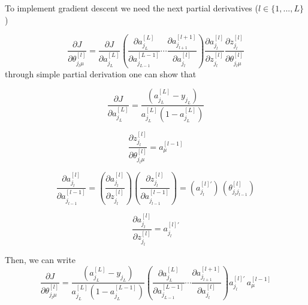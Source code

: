 \documentclass[a4paper,11pt]{article}
\newcommand{\na}[2]{a_{#1}^{[#2]}}
\newcommand{\nz}[2]{z_{#1}^{[#2]}}
\newcommand{\nt}[3]{\theta_{#1 #2}^{[#3]}}
\begin{document}
To implement gradient descent we need 
the next partial derivatives ($l\in\{1,...,L\} $)

\begin{equation}
    \frac{\partial J }{\partial  \nt{j_l}{\mu}{l}  } 
   =\frac{\partial J  }{\partial \na{j_L}{L}  }
    \left(
    \frac{\partial \na{j_L}{L}  }{\partial \na{j_{L-1}}{L-1}  }
    \cdots
    \frac{\partial \na{j_{l+1}}{l+1}   }{\partial \na{j_l}{l}   }
    \right)
    \frac{\partial \na{j_l}{l}   }{\partial \nz{j_l}{l}   }
    \frac{\partial \nz{j_l}{l} }
        {\partial \nt{j_l}{\mu}{l}  }
\end{equation}
through simple partial derivation one can show that 

\begin{equation}
    \frac{\partial J  }{\partial \na{j_L}{L}  }
    = \frac{(\na{j_L}{L} -y_{j_L})}{\na{j_L}{L} (1-\na{j_L}{L} )} 
\end{equation}


\begin{equation}
  \frac{\partial \nz{j_l}{l}  }
        {\partial \nt{j_l}{\mu}{l}  }
        =  \na{\mu}{l-1}
\end{equation}

\begin{equation}
    \frac{\partial \na{j_l}{l}  }
    {\partial \na{j_{l-1}}{l-1}  }
    =
   \left( \frac{\partial \na{j_l}{l}}   {\partial \nz{j_{l}}{l}  }\right)
   \left( \frac{\partial \nz{j_{l}}{l} }   {\partial \na{j_{l-1}}{l-1}  }\right)
    = \left( a^{[l]'}_{j_{l} }\right)
    \, \left( \nt{j_l}{j_{l-1}}{l} \right)
\end{equation}

\begin{equation}
	\frac{\partial \na{j_{l}}{l}   }{\partial \nz{j_{l}}{l}   } =  a_{j_{l}}^{[l]'}
\end{equation} 

Then, we can write
\begin{equation}
    \frac{\partial J }{\partial  \nt{j_l}{\mu}{l}  } =
    \frac{(\na{j_L}{L} -y_{j_L})}{\na{j_L}{L} (1-\na{j_L}{L-1} )} 
    \left(
    \frac{\partial \na{j_L}{L}  }{\partial \na{j_{L-1}}{L-1}  }
    \cdots\frac{\partial \na{j_{l+1}}{l+1}   }{\partial \na{j_{l}}{l}   } 
    \right) a_{j_{l}}^{[l]'} 
   \, \na{\mu}{l-1} 
\end{equation}
\end{document}
